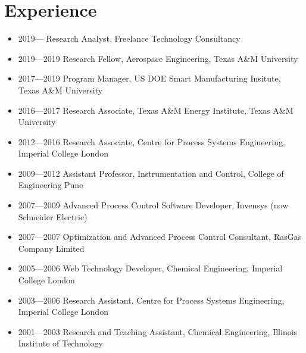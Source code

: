 \documentclass[10pt]{article}
\begin{document}


\section{Experience}
\begin{itemize}[itemsep=-1mm]
\item 2019---{\color{white}{0000}} \;\; Research Analyst, Freelance Technology Consultancy
\item 2019---2019 \;\; Research Fellow, Aerospace Engineering, Texas A\&M University
\item 2017---2019 \;\; Program Manager, US DOE Smart Manufacturing Insitute, Texas A\&M University
\item 2016---2017 \;\; Research Associate, Texas A\&M Energy Institute, Texas A\&M University
\item 2012---2016 \;\; Research Associate, Centre for Process Systems Engineering, Imperial College London
\item 2009---2012 \;\; Assistant Professor, Instrumentation and Control, College of Engineering Pune
\item 2007---2009 \;\; Advanced Process Control Software Developer, Invensys (now Schneider Electric)
\item 2007---2007 \;\; Optimization and Advanced Process Control Consultant, RasGas Company Limited
\item 2005---2006 \;\; Web Technology Developer, Chemical Engineering, Imperial College London
\item 2003---2006 \;\; Research Assistant, Centre for Process Systems Engineering, Imperial College London
\item 2001---2003 \;\; Research and Teaching Assistant, Chemical Engineering, Illinois Institute of Technology
\end{itemize}
\end{document}
